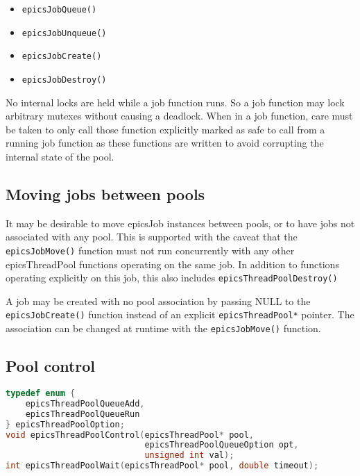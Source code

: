\begin{itemize}
\item \verb|epicsJobQueue()|
\item \verb|epicsJobUnqueue()|
\item \verb|epicsJobCreate()|
\item \verb|epicsJobDestroy()|
\end{itemize}

No internal locks are held while a job function runs.
So a job function may lock arbitrary mutexes without causing a deadlock.
When in a job function, care must be taken to only call those function explicitly
marked as safe to call from a running job function as these functions
are written to avoid corrupting the internal state of the pool.


\subsection{Moving jobs between pools}

It may be desirable to move epicsJob instances between pools, or to
have jobs not associated with any pool. This is supported with the
caveat that the \verb|epicsJobMove()| function must not run concurrently
with any other epicsThreadPool functions operating on the same job.
In addition to functions operating explicitly on this job, this also includes
\verb|epicsThreadPoolDestroy()|

A job may be created with no pool association by passing NULL to the \verb|epicsJobCreate()|
function instead of an explicit \verb|epicsThreadPool*| pointer. The association can be changed
at runtime with the \verb|epicsJobMove()| function.


\subsection{Pool control}

\begin{lstlisting}[language=C]
typedef enum {
    epicsThreadPoolQueueAdd,
    epicsThreadPoolQueueRun
} epicsThreadPoolOption;
void epicsThreadPoolControl(epicsThreadPool* pool,
                            epicsThreadPoolQueueOption opt,
                            unsigned int val);
int epicsThreadPoolWait(epicsThreadPool* pool, double timeout);
\end{lstlisting}



